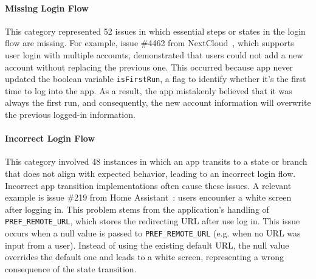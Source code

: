 \paragraph{Missing Login Flow}\label{Missingloginflow}
This category represented 52 issues in which essential steps or states in the login flow are missing.
For example, issue \#4462 from NextCloud~\cite{nextcloud-android}, which supports user login with multiple accounts, demonstrated that users could not add a new account without replacing the previous one. This occurred because app never updated the boolean variable  \texttt{isFirstRun}, a flag to identify whether it's the first time to log into the app.
As a result, the app mistakenly believed that it was always the first run, and consequently, the new account information will overwrite the previous logged-in information.

\paragraph{Incorrect Login Flow}
This category involved 48 instances in which an app transits to a state or branch that does not align with expected behavior, leading to an incorrect login flow.
Incorrect app transition implementations often cause these issues.
A relevant example is issue \#219 from Home Assistant~\cite{home-assistant-android}: users encounter a white screen after logging in. This problem stems from the application's handling of \texttt{PREF\_REMOTE\_URL}, which stores the redirecting URL after use log in. This issue occurs when a null value is passed to \texttt{PREF\_REMOTE\_URL} (e.g. when no URL was input from a user). Instead of using the existing default URL, the null value overrides the default one and leads to a white screen, representing a wrong consequence of the state transition.


